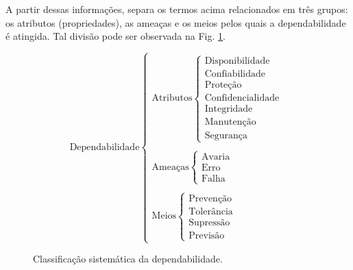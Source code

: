 A partir dessas informações,  separa os termos acima
relacionados em três grupos: os atributos (propriedades), as ameaças e os meios
pelos quais a dependabilidade é atingida. Tal divisão pode ser observada na Fig.
\ref{fig:div_avizienis}.

\begin{figure}[htb]
\centering
\footnotesize
\[
\text{Dependabilidade}
\left\{
\begin{array}{l}
\text{Atributos}
    \left\{
    \begin{array}{l}
        \text{Disponibilidade}\\
        \text{Confiabilidade}\\
        \text{Proteção}\\
        \text{Confidencialidade}\\
        \text{Integridade}\\
        \text{Manutenção}\\
        \text{Segurança}
    \end{array}
    \right.
\\
\\
\text{Ameaças}
    \left\{
    \begin{array}{l}
        \text{Avaria}\\
        \text{Erro}\\
        \text{Falha}
    \end{array}
    \right.
\\
\\
\text{Meios}
    \left\{
    \begin{array}{l}
        \text{Prevenção}\\
        \text{Tolerância}\\
        \text{Supressão}\\
        \text{Previsão}
    \end{array}
    \right.
\end{array}
\right.
\]
\caption{Classificação sistemática da dependabilidade.}
\label{fig:div_avizienis}
\end{figure}

